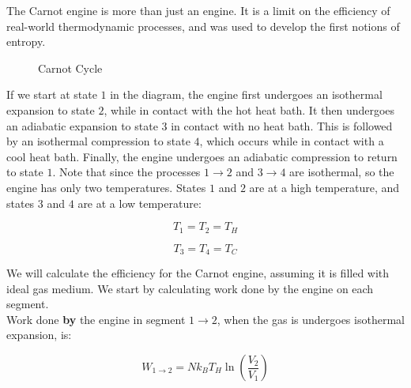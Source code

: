 The Carnot engine is more than just an engine. It is a limit on the efficiency of real-world thermodynamic processes, and was used to develop the first notions of entropy.

\begin{figure}[H]
	\centering
	\caption{Carnot Cycle}
\end{figure}

If we start at state $1$ in the diagram, the engine first undergoes an isothermal expansion to state $2$, while in contact with the hot heat bath. It then undergoes an adiabatic expansion to state $3$ in contact with no heat bath. This is followed by an isothermal compression to state $4$, which occurs while in contact with a cool heat bath. Finally, the engine undergoes an adiabatic compression to return to state $1$. Note that since the processes $1 \rightarrow 2$ and $3 \rightarrow 4$ are isothermal, so the engine has only two temperatures. States $1$ and $2$ are at a high temperature, and states $3$ and $4$ are at a low temperature:

\[T_1=T_2=T_H\]

\[T_3=T_4=T_C\]

We will calculate the efficiency for the Carnot engine, assuming it is filled with ideal gas medium. We start by calculating work done by the engine on each segment. \\

Work done \textbf{by} the engine in segment $1\to2$, when the gas is undergoes isothermal expansion, is:

\[W_{1\to2}=Nk_BT_H\ln\left(\frac{V_2}{V_1}\right)\]

